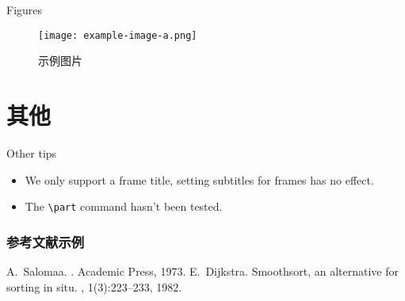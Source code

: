 \documentclass[no-math, aspectratio=1610, 10pt]{beamer}
\begin{document}
    \begin{frame}{Figures}
        \begin{figure}
            \texttt{[image: example-image-a.png]}
            \caption{示例图片}
        \end{figure}
    \end{frame}

    \section{其他}

    \begin{frame}[fragile]{Other tips}
        \begin{itemize}
            \item We only support a frame title, setting subtitles for frames has no effect.
            \item The \verb|\part| command hasn't been tested.
        \end{itemize}
    \end{frame}

    \begin{frame}
        \frametitle{参考文献示例}
        \begin{thebibliography}{Dijkstra, 1982}
          A.~Salomaa.
          .
          \newblock Academic Press, 1973.
          E.~Dijkstra.
          \newblock Smoothsort, an alternative for sorting in situ.
          , 1(3):223--233, 1982.
        \end{thebibliography}
      \end{frame}
\end{document}
